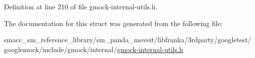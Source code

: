 Definition at line 210 of file gmock-\/internal-\/utils.\+h.



The documentation for this struct was generated from the following file\+:\begin{DoxyCompactItemize}
\item 
smacc\+\_\+sm\+\_\+reference\+\_\+library/sm\+\_\+panda\+\_\+moveit/libfranka/3rdparty/googletest/googlemock/include/gmock/internal/\hyperlink{gmock-internal-utils_8h}{gmock-\/internal-\/utils.\+h}\end{DoxyCompactItemize}
